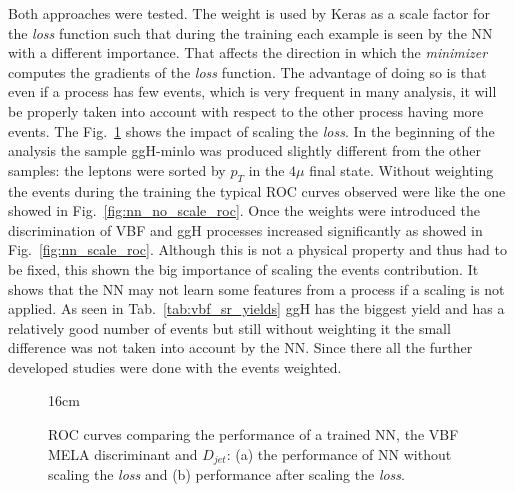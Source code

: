 Both approaches were tested. The weight is used by Keras as a scale factor for the \textit{loss} function such that during the training each example is seen by the NN with a different importance. That affects the direction in which the \textit{minimizer} computes the gradients of the \textit{loss} function. The advantage of doing so is that even if a process has few events, which is very frequent in many analysis, it will be properly taken into account with respect to the other process having more events. The Fig.~\ref{fig:scaling_training_effect} shows the impact of scaling the \textit{loss}. In the beginning of the analysis the sample ggH-minlo was produced slightly different from the other samples: the leptons were sorted by $p_{T}$ in the $4\mu$ final state. Without weighting the events during the training the typical ROC curves observed were like the one showed in Fig.~\ref{fig:nn_no_scale_roc}. Once the weights were introduced the discrimination of VBF and ggH processes increased significantly as showed in Fig.~\ref{fig:nn_scale_roc}. Although this is not a physical property and thus had to be fixed, this shown the big importance of scaling the events contribution. It shows that the NN may not learn some features from a process if a scaling is not applied. As seen in Tab.~\ref{tab:vbf_sr_yields} ggH has the biggest yield and has a relatively good number of events but still without weighting it the small difference was not taken into account by the NN. Since there all the further developed studies were done with the events weighted.

\begin{figure}[hbtp]{16cm}
	\caption{ROC curves comparing the performance of a trained NN, the VBF MELA discriminant and $D_{jet}$: (a) the performance of NN without scaling the \textit{loss} and (b) performance after scaling the \textit{loss}.}
	\centering
	\quad
	\quad
	\label{fig:scaling_training_effect}
\end{figure}

